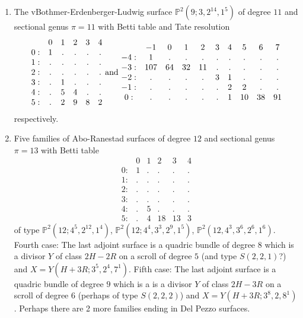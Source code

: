 \documentclass[twoside,12pt, leqno]{amsart}
\def\PP{{\mathbb P}}
\begin{document}
\begin{enumerate}
\item The vBothmer-Erdenberger-Ludwig surface $\PP^{2}(9;3,2^{14},1^{5})$ of degree $11$ and sectional genus $\pi=11$ with Betti table and Tate resolution
$$\begin{matrix}
       & 0 & 1 & 2 & 3 & 4\\
      0: & 1 & . & . & . & .\\
      1: & . & . & . & . & .\\
      2: & . & . & . & . & .\\
      3: & . & 1 & . & . & .\\
      4: & . & 5 & 4 & . & .\\
      5: & . & 2 & 9 & 8 & 2
      \end{matrix}
\hbox{ and  } 
\begin{matrix}
        & -1 & 0 & 1 & 2 & 3 & 4 & 5 & 6 & 7\\
       -4: & 1 & . & . & . & . & . & . & . & .\\
       -3: & 107 & 64 & 32 & 11 & . & . & . & . & .\\
       -2: & . & . & . & . & 3 & 1 & . & . & .\\
       -1: & . & . & . & . & . & 2 & 2 & . & .\\
       0: & . & . & . & . & . & 1 & 10 & 38 & 91
       \end{matrix}
$$
respectively.

\item\label{ARsurf} Five families of Abo-Ranestad surfaces of degree $12$ and sectional genus $\pi=13$ with Betti table
$$\begin{matrix}
       & 0 & 1 & 2 & 3 & 4\\
      0: & 1 & . & . & . & .\\
      1: & . & . & . & . & .\\
      2: & . & . & . & . & .\\
      3: & . & . & . & . & .\\
      4: & . & 5 & . & . & .\\
      5: & . & 4 & 18 & 13 & 3
      \end{matrix}$$
of type $\PP^{2}(12;4^{5},2^{12},1^{4})$, $\PP^{2}(12;4^{4},3^{3},2^{9},1^{5})$, $\PP^{2}(12,4^{3},3^{6},2^{6},1^{6})$.
Fourth case: The last adjoint surface is a quadric bundle of degree $8$ which is a divisor $Y$ of class $2H-2R$ on a scroll of degree $5$ (and type $S(2,2,1)$?) and
$X=Y(H+3R;3^{5},2^{4},7^{1})$.
Fifth case: The last adjoint surface is a quadric bundle of degree $9$ which is a is a divisor $Y$ of class $2H-3R$ on a scroll of degree $6$ (perhaps of type $S(2,2,2)$) and
$X=Y(H+3R;3^{8},2,8^{1})$. Perhaps there are 2 more families ending in Del Pezzo surfaces.


\end{enumerate}
\end{document}
